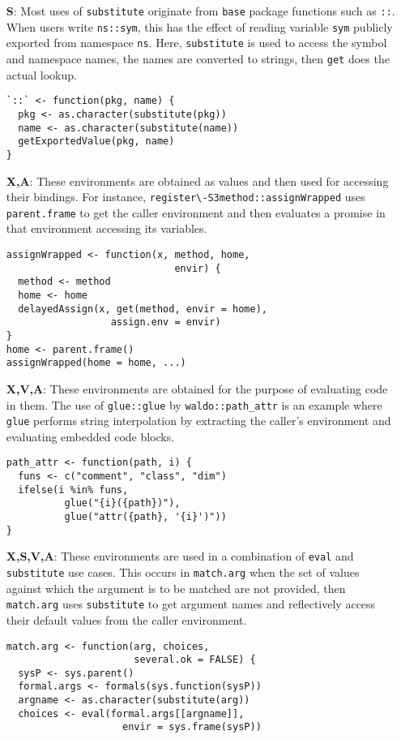 \documentclass[10pt,sigplan,authorversion=true]{acmart}
\renewcommand{\c}[1]{\lstinline |#1|\xspace}
\newcommand{\base}{\c{base}}
\newcommand{\eval}{\c{eval}}
\newcommand{\substitute}{\c{substitute}}
\begin{document}
\begin{itemize}
\item[{\bf S}:] Most uses of \c{substitute} originate from \base package
  functions such as \c{::}. When users write \c{ns::sym}, this has the effect of
  reading variable \c{sym} publicly exported from namespace \c{ns}. Here,
  \substitute is used to access the symbol and namespace names, the names are
  converted to strings, then \c{get} does the actual lookup.

\begin{lstlisting}
`::` <- function(pkg, name) {
  pkg <- as.character(substitute(pkg))
  name <- as.character(substitute(name))
  getExportedValue(pkg, name)
}
\end{lstlisting}\medskip

\item[{\bf X,A}:] These environments are obtained as values and then used for
  accessing their bindings. For instance, \c{register\-S3method::assignWrapped}
  uses \c{parent.frame} to get the caller environment and then evaluates a
  promise in that environment accessing its variables.

\begin{lstlisting}
assignWrapped <- function(x, method, home,
                             envir) {
  method <- method
  home <- home
  delayedAssign(x, get(method, envir = home),
                  assign.env = envir)
}
home <- parent.frame()
assignWrapped(home = home, ...)
\end{lstlisting}\medskip

\item[{\bf X,V,A}:] These environments are obtained for the purpose of
  evaluating code in them. The use of \c{glue::glue} by \c{waldo::path_attr} is
  an example where \c{glue} performs string interpolation by extracting the
  caller's environment and evaluating embedded code blocks.

\begin{lstlisting}
path_attr <- function(path, i) {
  funs <- c("comment", "class", "dim")
  ifelse(i %in% funs,
          glue("{i}({path})"),
          glue("attr({path}, '{i}')"))
}
\end{lstlisting}\medskip

\item[{\bf X,S,V,A}:] These environments are used in a combination of \eval and
  \substitute use cases. This occurs in \c{match.arg} when the set of values
  against which the argument is to be matched are not provided, then
  \c{match.arg} uses \c{substitute} to get argument names and reflectively
  access their default values from the caller environment.

\begin{lstlisting}
match.arg <- function(arg, choices,
                      several.ok = FALSE) {
  sysP <- sys.parent()
  formal.args <- formals(sys.function(sysP))
  argname <- as.character(substitute(arg))
  choices <- eval(formal.args[[argname]], 
                    envir = sys.frame(sysP))
\end{lstlisting}\medskip

\end{itemize}
\end{document}
